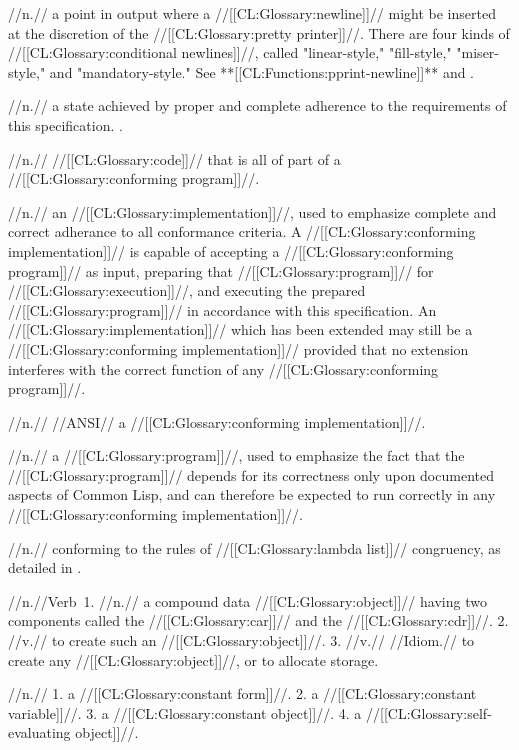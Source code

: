  //n.// a point in output where a //[[CL:Glossary:newline]]// might be inserted at the discretion of the //[[CL:Glossary:pretty printer]]//. There are four kinds of //[[CL:Glossary:conditional newlines]]//, called "linear-style," "fill-style," "miser-style," and "mandatory-style." See **[[CL:Functions:pprint-newline]]** and \secref\DynamicControlofOutput.

 //n.// a state achieved by proper and complete adherence to the requirements of this specification. \Seesection\Conformance.

 //n.// //[[CL:Glossary:code]]// that is all of part of a //[[CL:Glossary:conforming program]]//.

 //n.// an //[[CL:Glossary:implementation]]//, used to emphasize complete and correct adherance to all conformance criteria. A //[[CL:Glossary:conforming implementation]]// is capable of accepting a //[[CL:Glossary:conforming program]]// as input, preparing that //[[CL:Glossary:program]]// for //[[CL:Glossary:execution]]//, and executing the prepared //[[CL:Glossary:program]]// in accordance with this specification. An //[[CL:Glossary:implementation]]// which has been extended may still be a //[[CL:Glossary:conforming implementation]]// provided that no extension interferes with the correct function of any //[[CL:Glossary:conforming program]]//.

 //n.// //ANSI// a //[[CL:Glossary:conforming implementation]]//.

 //n.// a //[[CL:Glossary:program]]//, used to emphasize the fact that the //[[CL:Glossary:program]]// depends for its correctness only upon documented aspects of Common Lisp, and can therefore be expected to run correctly in any //[[CL:Glossary:conforming implementation]]//.

 //n.// conforming to the rules of //[[CL:Glossary:lambda list]]// congruency, as detailed in \secref\GFMethodLambdaListCongruency.

 //n.//Verb\ 1. //n.// a compound data //[[CL:Glossary:object]]// having two components called the //[[CL:Glossary:car]]// and the //[[CL:Glossary:cdr]]//. 2. //v.// to create such an //[[CL:Glossary:object]]//. 3. //v.// //Idiom.// to create any //[[CL:Glossary:object]]//, or to allocate storage.

 //n.// 1. a //[[CL:Glossary:constant form]]//. 2. a //[[CL:Glossary:constant variable]]//. 3. a //[[CL:Glossary:constant object]]//. 4. a //[[CL:Glossary:self-evaluating object]]//.

